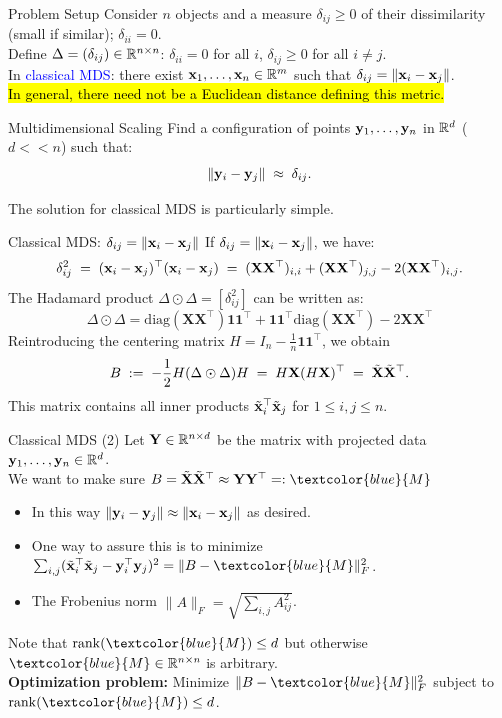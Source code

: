 \documentclass[11pt,handout,aspectratio=169]{beamer}
\begin{document}
\begin{frame}{Problem Setup}
Consider $n$ objects and  a measure $\delta_{ij}\geq 0$ of their dissimilarity (small if similar); $\delta_{ii}=0$.\\[3mm]
Define $\Delta=(\delta_{ij})\in \mathbb R^{n\times n}$: $\delta_{ii}=0$ for all $i$, $\delta_{ij}\geq 0$ for all $i\neq j$. \\[5mm]

In \textcolor{blue}{classical MDS}: there exist $\mathbf{x}_1,\ldots,\mathbf{x}_n\in \mathbb R^m$ such that $\delta_{ij}=\|\mathbf{x}_i-\mathbf{x}_j\|$.\\[5mm]
 \hl{In general, there need not be a Euclidean distance defining this metric.}
\begin{alertblock}{Multidimensional Scaling}
	Find a configuration of points $\mathbf{y}_1,\ldots,\mathbf{y}_n$ in $\mathbb R^d$ ($d<\!\!<n$) such that:
	$$
	\|\mathbf{y}_i-\mathbf{y}_j\|\;\approx\;\delta_{ij}.
	$$ 
\end{alertblock}
The solution for classical MDS is particularly simple.
\end{frame}

\begin{frame}{Classical MDS: $\delta_{ij}=\|\mathbf{x}_i-\mathbf{x}_j\|$}
If $\delta_{ij}=\|\mathbf{x}_i-\mathbf{x}_j\|$, we have:
\[\delta_{ij}^2 \;=\; (\mathbf{x}_i - \mathbf{x}_j)^{\top}(\mathbf{x}_i - \mathbf{x}_j)\;=\;(\mathbf{X}\mathbf{X}^\top)_{i,i}+(\mathbf{X}\mathbf{X}^\top)_{j,j}-2(\mathbf{X}\mathbf{X}^\top)_{i,j}.\]
The Hadamard product $\Delta\odot\Delta=[\delta_{ij}^2]$ can be written as:
	\[\Delta \odot \Delta = \mathrm{diag}(\mathbf{X}\mathbf{X}^{\top}) \mathbf{1} \mathbf{1}^{\top} + \mathbf{1} \mathbf{1}^{\top} \mathrm{diag}(\mathbf{X}\mathbf{X}^{\top}) - 2\mathbf{X}\mathbf{X}^{\top}\]
	Reintroducing the centering matrix $H = I_n - \frac{1}{n}\mathbf{1}\mathbf{1}^{\top}$, we obtain
	\[B \;:=\; -\frac{1}{2} H (\Delta \odot \Delta) H\;=\;H\mathbf{X} (H\mathbf{X})^\top \;=\;\tilde{\mathbf{X}}\tilde{\mathbf{X}}^\top.\]
	This matrix contains all inner products $\tilde{\mathbf{x}}_i^\top\tilde{\mathbf{x}}_j$ for $1\leq i,j\leq n$.
\end{frame}

\begin{frame}{Classical MDS (2)}
Let $\mathbf{Y}\in \mathbb R^{n\times d}$ be the matrix with projected data $\mathbf{y}_1,\ldots,\mathbf{y}_n\in \mathbb R^d$. \\[3mm]
We want to make sure $B=\tilde\X\tilde\X^\top\approx \Y\Y^\top=:\textcolor{blue}{M}$
\begin{itemize}
	\item In this way $\|\mathbf{y}_i-\mathbf{y}_j\|\approx \|\mathbf{x}_i-\mathbf{x}_j\|$ as desired. 
	\item One way to assure this is to minimize $\sum_{i,j}(\tilde\x_i^\top \tilde\x_j-\y_i^\top\y_j)^2=\|B-\textcolor{blue}{M}\|^2_F$.
	\item The Frobenius norm $\|A\|_F=\sqrt{\sum_{i,j} A_{ij}^2}$.\\[3mm]
\end{itemize}
Note that ${\rm rank}(\textcolor{blue}{M})\leq d$ but otherwise $\textcolor{blue}{M}\in \R^{n\times n}$ is arbitrary.\\[3mm]
\textbf{Optimization problem:} Minimize $\|B-\textcolor{blue}{M}\|^2_F$ subject to ${\rm rank}(\textcolor{blue}{M})\leq d$.
\end{frame}
\end{document}

